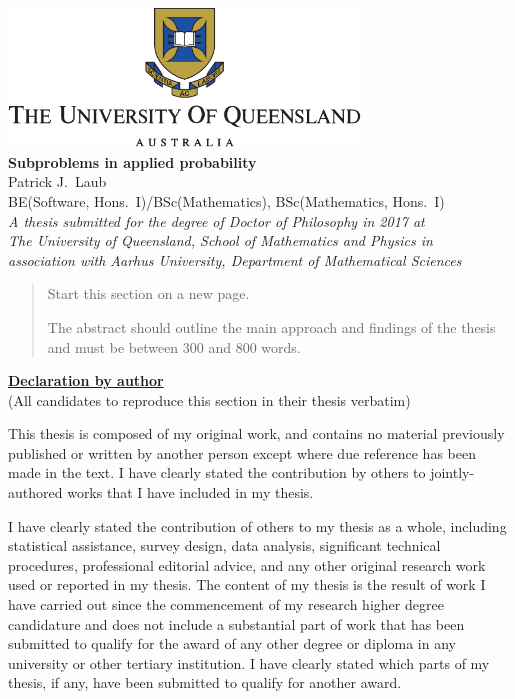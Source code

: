 \begin{titlepage}
\begin{center}
\includegraphics[width=0.70\textwidth]{logo} \\[2cm]

{ \large \bfseries Subproblems in applied probability }\\
Patrick J.\ Laub \\
BE(Software, Hons.\ I)/BSc(Mathematics), BSc(Mathematics, Hons.\ I) \\[7cm]
{\em A thesis submitted for the degree of Doctor of Philosophy in 2017 at\\
The University of Queensland, School of Mathematics and Physics in \\
association with
Aarhus University, Department of Mathematical Sciences} \\

\end{center}
\end{titlepage}


\begin{abstract}
  Start this section on a new page.

  The abstract should outline the main approach and findings of the thesis and
  must be between 300 and 800 words.
\end{abstract}

\newpage
{\bf \underline{Declaration by author}} \\
(All candidates to reproduce this section in their thesis verbatim)

This thesis is composed of my original work, and contains no material
previously published or written by another person except where due reference
has been made in the text. I have clearly stated the contribution by others to
jointly-authored works that I have included in my thesis.

I have clearly stated the contribution of others to my thesis as a whole,
including statistical assistance, survey design, data analysis, significant
technical procedures, professional editorial advice, and any other original
research work used or reported in my thesis. The content of my thesis is the
result of work I have carried out since the commencement of my research higher
degree candidature and does not include a substantial part of work that has
been submitted to qualify for the award of any other degree or diploma in any
university or other tertiary institution. I have clearly stated which parts of
my thesis, if any, have been submitted to qualify for another award.

